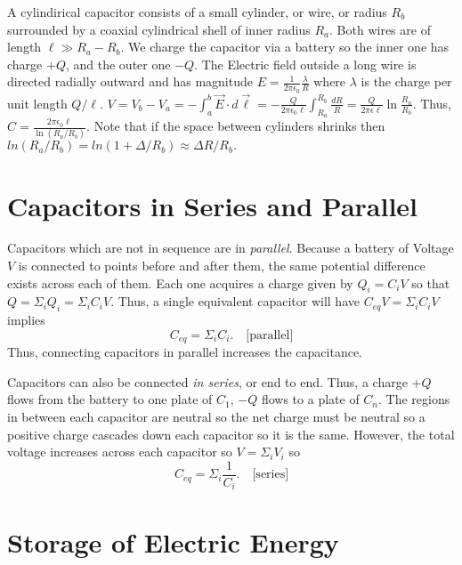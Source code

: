 \begin{example}
    A cylindirical capacitor consists of a small cylinder, or wire, or radius $R_b$ surrounded by a coaxial cylindrical shell of inner radius $R_a$. Both wires are of length $\ell \gg R_a - R_b$. We charge the capacitor via a battery so the inner one has charge $+Q$, and the outer one $-Q$. The Electric field outside a long wire is directed radially outward and has magnitude $E = \frac{1}{2\pi\epsilon_0}\frac{\lambda}{R}$ where $\lambda$ is the charge per unit length $Q/\ell$. $V = V_b - V_a = -\int_a^b \vec{E}\cdot d\vec{\ell} = -\frac{Q}{2\pi\epsilon_0\ell}\int_{R_a}^{R_b}\frac{dR}{R} = \frac{Q}{2\pi\epsilon\ell}\ln\frac{R_a}{R_b}.$ Thus, $C = \frac{2\pi\epsilon_0\ell}{\ln(R_a/R_b)}.$ Note that if the space between cylinders shrinks then $ln(R_a/R_b) = ln(1 + \Delta/R_b) \approx \Delta R/R_b.$
\end{example}

\section{Capacitors in Series and Parallel}

\begin{definition}
    Capacitors which are not in sequence are in \emph{parallel}. Because a battery of Voltage $V$ is connected to points before and after them, the same potential difference exists across each of them. Each one acquires a charge given by $Q_i = C_iV$ so that $Q = \Sigma_iQ_i = \Sigma_iC_iV$. Thus, a single equivalent capacitor will have $C_{eq}V = \Sigma_iC_iV$ implies  $$C_{eq} = \Sigma_i C_i. \quad\text{[parallel]}$$Thus, connecting capacitors in parallel increases the capacitance.
\end{definition}
\begin{definition}
    Capacitors can also be connected \emph{in series}, or end to end. Thus, a charge $+Q$ flows from the battery to one plate of $C_1$, $-Q$ flows to a plate of $C_n$. The regions in between each capacitor are neutral so the net charge must be neutral so a positive charge cascades down each capacitor so it is the same. However, the total voltage increases across each capacitor so $V=\Sigma_iV_i$ so $$C_{eq} = \Sigma_i\frac{1}{C_i}.\quad\text{[series]}$$
\end{definition}

\section{Storage of Electric Energy}

